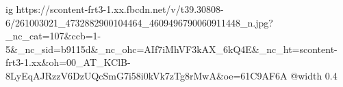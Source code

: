  
 
 
 
 

\ifcmt
  ig https://scontent-frt3-1.xx.fbcdn.net/v/t39.30808-6/261003021_4732882900104464_4609496790060911448_n.jpg?_nc_cat=107&ccb=1-5&_nc_sid=b9115d&_nc_ohc=AIf7iMhVF3kAX_6kQ4E&_nc_ht=scontent-frt3-1.xx&oh=00_AT_KClB-8LyEqAJRzzV6DzUQcSmG7i58i0kVk7zTg8rMwA&oe=61C9AF6A
  @width 0.4
\fi
